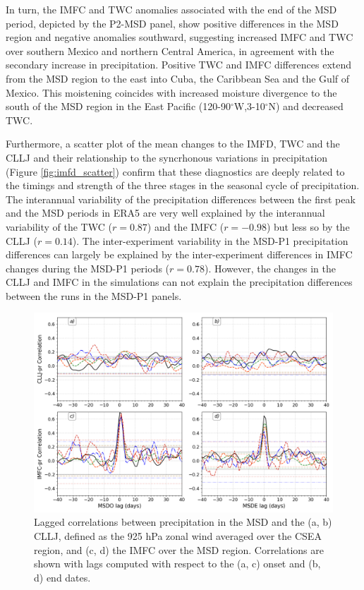 In turn, the IMFC and TWC anomalies associated with the end of the MSD period, depicted by the P2-MSD panel,  show positive differences in the MSD region and negative anomalies southward, suggesting increased IMFC and TWC over southern Mexico and northern Central America, in agreement with the secondary increase in precipitation. Positive TWC and IMFC differences extend from the MSD region to the east into Cuba, the Caribbean Sea and the Gulf of Mexico. This moistening coincides with increased moisture divergence to the south of the MSD region in the East Pacific (120-90$^\circ$W,3-10$^\circ$N) and decreased TWC. 


Furthermore, a scatter plot of the mean changes to the IMFD, TWC and the CLLJ and their relationship to the syncrhonous variations in precipitation (Figure \ref{fig:imfd_scatter}) confirm that these diagnostics are deeply related to the timings and strength of the three stages in the seasonal cycle of precipitation. The interannual variability of the precipitation differences between the first peak and the MSD periods in ERA5  are very well explained by the interannual variability of the TWC ($r=0.87$) and the IMFC ($r=-0.98$) but less so by the CLLJ ($r=0.14$). The inter-experiment variability in the MSD-P1 precipitation differences can largely be explained by the inter-experiment differences in IMFC changes during the MSD-P1 periods ($r=0.78$). However, the changes in the CLLJ and IMFC in the simulations can not explain the precipitation differences between the runs in the MSD-P1 panels. 

\begin{figure}[t!]
\includegraphics[width=\linewidth]{figures/lag_imfdcllj.png}
\caption[Lagged correlations of the CLLJ and IMFC indices with precipitation.]{Lagged correlations between precipitation in the MSD and the (a, b) CLLJ, defined as the 925 hPa zonal wind averaged over the CSEA region, and (c, d) the IMFC over the MSD region. Correlations are shown with lags computed with respect to the (a, c) onset and (b, d) end dates.  }
\label{fig:cllj_lag}
\end{figure}



